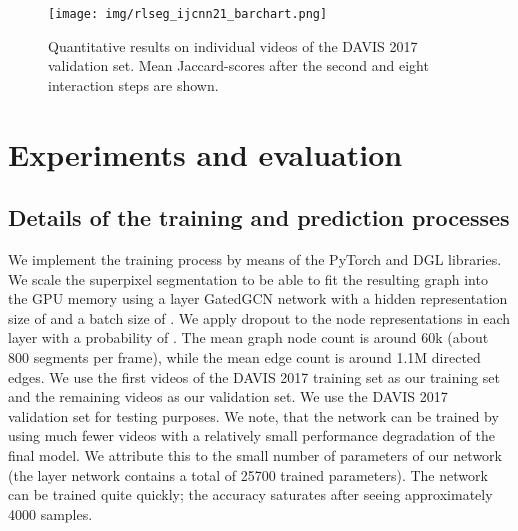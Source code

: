 \documentclass[conference]{IEEEtran}
\begin{document}
\begin{figure*}
    \centering 
    \texttt{[image: img/rlseg\_ijcnn21\_barchart.png]}
    \caption{Quantitative results on individual videos of the DAVIS 2017 validation set. Mean Jaccard-scores after the second and eight interaction steps are shown.}
    \label{fig:barchart}
\end{figure*}

\section{Experiments and evaluation} \label{sec:results}

\subsection{Details of the training and prediction processes}

We implement the training process by means of the PyTorch \cite{pytorch} and DGL \cite{gnn_dgl} libraries. We scale the superpixel segmentation to be able to fit the resulting graph into the GPU memory using a  layer GatedGCN network with a hidden representation size of  and a batch size of . We apply dropout to the node representations in each layer with a probability of . The mean graph node count is around 60k (about 800 segments per frame), while the mean edge count is around 1.1M directed edges. We use the first  videos of the DAVIS 2017 training set as our training set and the remaining  videos as our validation set. We use the DAVIS 2017 validation set for testing purposes. We note, that the network can be trained by using much fewer videos with a relatively small performance degradation of the final model. We attribute this to the small number of parameters of our network (the  layer network contains a total of 25700 trained parameters). The network can be trained quite quickly; the accuracy saturates after seeing approximately 4000 samples.
\end{document}
